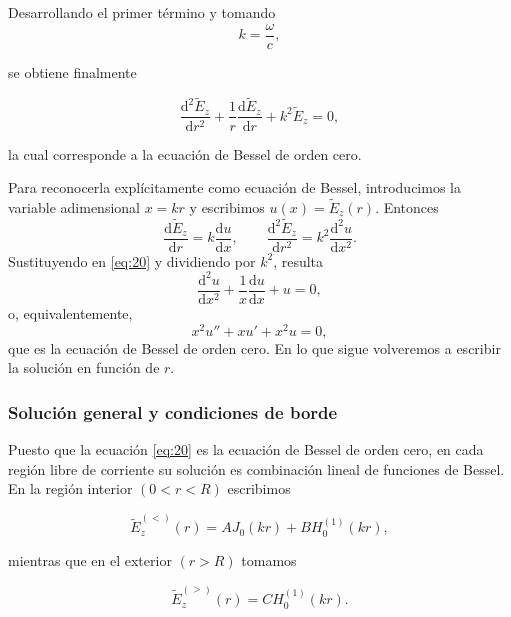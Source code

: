 \documentclass{article}
\numberwithin{equation}{section}
\newcommand{\ud}{\mathrm{d}}
\begin{document}
Desarrollando el primer término y tomando
\begin{equation*}
    k=\frac{\omega}{c},
\end{equation*}

se obtiene finalmente

\begin{equation}\tag{20}\label{eq:20}
    \frac{\ud^2\widetilde E_z}{\ud r^2}+\frac{1}{r}\frac{\ud \widetilde E_z}{\ud r}+k^2\widetilde E_z=0,
\end{equation}

la cual corresponde a la ecuación de Bessel de orden cero.

Para reconocerla explícitamente como ecuación de Bessel, introducimos la variable adimensional $x=kr$ y escribimos $u(x)=\widetilde E_z(r)$. Entonces
\begin{equation*}
    \frac{\ud \widetilde E_z}{\ud r}=k\frac{\ud u}{\ud x},
    \qquad
    \frac{\ud^2\widetilde E_z}{\ud r^2}=k^2\frac{\ud^2u}{\ud x^2}.
\end{equation*}
Sustituyendo en \eqref{eq:20} y dividiendo por $k^2$, resulta
\begin{equation*}
    \frac{\ud^2u}{\ud x^2}+\frac{1}{x}\frac{\ud u}{\ud x}+u=0,
\end{equation*}
o, equivalentemente,
\begin{equation*}
    x^2u''+xu'+x^2u=0,
\end{equation*}
que es la ecuación de Bessel de orden cero. En lo que sigue volveremos a escribir la solución en función de $r$.

\subsubsection{Solución general y condiciones de borde}

Puesto que la ecuación \eqref{eq:20} es la ecuación de Bessel de orden cero, en cada región libre de corriente su solución es combinación lineal de funciones de Bessel. En la región interior $(0<r<R)$ escribimos

\begin{equation}\tag{21}\label{eq:21}
    \widetilde E_z^{(<)}(r)=AJ_0(kr)+BH_0^{(1)}(kr),
\end{equation}

mientras que en el exterior $(r>R)$ tomamos

\begin{equation}\tag{22}\label{eq:22}
    \widetilde E_z^{(>)}(r)=CH_0^{(1)}(kr).
\end{equation}
\end{document}
